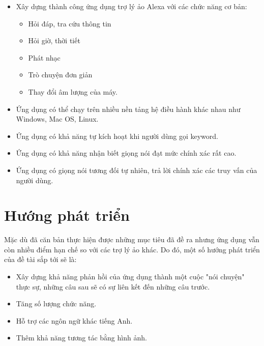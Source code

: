 \begin{itemize}
    \item Xây dựng thành công ứng dụng trợ lý ảo Alexa với các chức năng cơ bản:
    \begin{itemize}
        \item Hỏi đáp, tra cứu thông tin
        \item Hỏi giờ, thời tiết
        \item Phát nhạc
        \item Trò chuyện đơn giản
        \item Thay đổi âm lượng của máy.
    \end{itemize}
    \item Ứng dụng có thể chạy trên nhiều nền tảng hệ điều hành khác nhau như Windows, Mac OS, Linux.
    \item Ứng dụng có khả năng tự kích hoạt khi người dùng gọi keyword.
    \item Ứng dụng có khả năng nhận biết giọng nói đạt mức chính xác rất cao.
    \item Ứng dụng có giọng nói tương đối tự nhiên, trả lời chính xác các truy vấn của người dùng.
\end{itemize}

\section{Hướng phát triển}

Mặc dù đã căn bản thực hiện được những mục tiêu đã đề ra nhưng ứng dụng vẫn còn nhiều điểm hạn chế so với các trợ lý ảo khác. Do đó, một số hướng phát triển của đề tài sắp tới sẽ là:

\begin{itemize}
    \item Xây dựng khả năng phản hồi của ứng dụng thành một cuộc "nói chuyện" thực sự, những câu sau sẽ có sự liên kết đến những câu trước.
    \item Tăng số lượng chức năng.
    \item Hỗ trợ các ngôn ngữ khác tiếng Anh.
    \item Thêm khả năng tương tác bằng hình ảnh.
\end{itemize}



